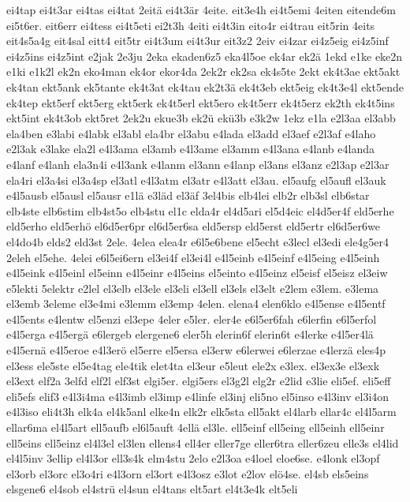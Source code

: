 {ei4tap
ei4t3ar
ei4tas
ei4tat
2eitä
ei4t3är
4eite.
eit3e4h
ei4t5emi
4eiten
eitende6m
ei5t6er.
eit6err
ei4tess
ei4t5eti
ei2t3h
4eiti
ei4t3in
eito4r
ei4trau
eit5rin
4eits
eit4s5a4g
eit4sal
eitt4
eit5tr
ei4t3um
ei4t3ur
eit3z2
2eiv
ei4zar
ei4z5eig
ei4z5inf
ei4z5ins
ei4z5int
e2jak
2e3ju
2eka
ekaden6z5
eka4l5oe
ek4ar
ek2ä
1ekd
e1ke
eke2n
e1ki
e1k2l
ek2n
eko4man
ek4or
ekor4da
2ek2r
ek2sa
ek4s5te
2ekt
ek4t3ae
ekt5akt
ek4tan
ekt5ank
ek5tante
ek4t3at
ek4tau
ek2t3ä
ek4t3eb
ekt5eig
ek4t3e4l
ekt5ende
ek4tep
ekt5erf
ekt5erg
ekt5erk
ek4t5erl
ekt5ero
ek4t5err
ek4t5erz
ek2th
ek4t5ins
ekt5int
ek4t3ob
ekt5ret
2ek2u
ekue3b
ek2ü
ekü3b
e3k2w
1ekz
e1la
e2l3aa
el3abb
ela4ben
e3labi
e4labk
el3abl
ela4br
el3abu
e4lada
el3add
el3aef
e2l3af
e4laho
e2l3ak
e3lake
ela2l
e4l3ama
el3amb
e4l3ame
el3amm
e4l3ana
e4lanb
e4landa
e4lanf
e4lanh
ela3n4i
e4l3ank
e4lanm
el3ann
e4lanp
el3ans
el3anz
e2l3ap
e2l3ar
ela4ri
el3a4si
el3a4sp
el3atl
e4l3atm
el3atr
e4l3att
el3au.
el5aufg
el5aufl
el3auk
e4l5ausb
el5ausl
el5ausr
e1lä
e3läd
el3äf
3el4bis
elb4lei
elb2r
elb3sl
elb6star
elb4ste
elb6stim
elb4st5o
elb4stu
el1c
elda4r
el4d5ari
el5d4eic
el4d5er4f
eld5erhe
eld5erho
eld5erhö
el6d5er6pr
el6d5er6sa
eld5ersp
eld5erst
eld5ertr
el6d5er6we
el4do4b
elds2
eld3st
2ele.
4elea
elea4r
e6l5e6bene
el5echt
e3lecl
el3edi
ele4g5er4
2eleh
el5ehe.
4elei
e6l5ei6ern
el3ei4f
el3ei4l
e4l5einb
e4l5einf
e4l5eing
e4l5einh
e4l5eink
e4l5einl
el5einn
e4l5einr
e4l5eins
el5einto
e4l5einz
el5eisf
el5eisz
el3eiw
e5lekti
5elektr
e2lel
el3elb
el3ele
el3eli
el3ell
el3els
el3elt
e2lem
e3lem.
e3lema
el3emb
3eleme
el3e4mi
e3lemm
el3emp
4elen.
elena4
elen6klo
e4l5ense
e4l5entf
e4l5ents
e4lentw
el5enzi
el3epe
4eler
e5ler.
eler4e
e6l5er6fah
e6lerfin
e6l5erfol
e4l5erga
e4l5ergä
e6lergeb
elergene6
eler5h
elerin6f
elerin6t
e4lerke
e4l5er4lä
e4l5ernä
e4l5eroe
e4l3erö
el5erre
el5ersa
el3erw
e6lerwei
e6lerzae
e4lerzä
eles4p
el3ess
ele5ste
el5e4tag
ele4tik
elet4ta
el3eur
e5leut
ele2x
e3lex.
el3ex3e
el3exk
el3ext
elf2a
3elfd
elf2l
elf3st
elgi5er.
elgi5ers
el3g2l
elg2r
e2lid
e3lie
eli5ef.
eli5eff
eli5efs
elif3
e4l3i4ma
e4l3imb
el3imp
e4linfe
el3inj
eli5no
el5inso
e4l3inv
el3i4on
e4l3iso
eli4t3h
elk4a
el4k5anl
elke4n
elk2r
elk5sta
ell5akt
el4larb
ellar4c
el4l5arm
ellar6ma
el4l5art
ell5aufb
el6l5auft
4ellä
el3le.
ell5einf
ell5eing
ell5einh
ell5einr
ell5eins
ell5einz
el4l3el
el3len
ellens4
ell4er
eller7ge
eller6tra
eller6zeu
elle3s
el4lid
el4l5inv
3ellip
el4l3or
ell3s4k
elm4stu
2elo
e2l3oa
e4loel
eloe6se.
e4lonk
el3opf
el3orb
el3orc
el3o4ri
e4l3orn
el3ort
e4l3osz
e3lot
e2lov
elö4se.
el4sb
els5eins
elsgene6
el4sob
el4strü
el4sun
el4tans
elt5art
el4t3e4k
elt5eli
}
